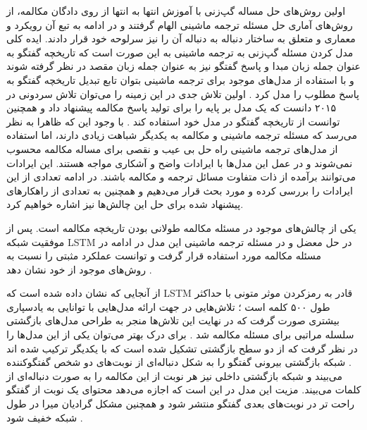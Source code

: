 اولین روش‌های حل مساله گپ‌زنی با آموزش انتها به انتها 	از روی دادگان مکالمه، از روش‌های آماری حل مسئله ترجمه ماشینی الهام گرفتند و در ادامه به تبع آن رویکرد و معماری 
و
متعلق به ساختار دنباله به دنباله آن را نیز سرلوحه خود قرار دادند. ایده کلی مدل‌ کردن مسئله گپ‌زنی به ترجمه ماشینی به این صورت است که تاریخچه گفتگو به عنوان جمله زبان مبدا و پاسخ گفتگو نیز به عنوان جمله زبان مقصد در نظر گرفته شوند و با استفاده از مدل‌های موجود برای ترجمه ماشینی بتوان تابع تبدیل تاریخچه گفتگو به پاسخ مطلوب را مدل کرد
\cite{ritter-etal-2011-data}
.
اولین تلاش جدی در این زمینه را می‌‌توان تلاش سردونی در ۲۰۱۵ دانست که یک مدل بر پایه 
را برای تولید پاسخ مکالمه پیشنهاد داد و همچنین توانست از تاریخچه گفتگو در مدل خود استفاده کند
\cite{DBLP:journals/corr/SordoniGABJMNGD15}
.
با وجود این که ظاهرا به نظر می‌رسد که مسئله ترجمه ماشینی و مکالمه به یکدیگر شباهت زیادی دارند، اما استفاده از مدل‌های ترجمه ماشینی راه حل بی عیب و نقصی برای مساله مکالمه محسوب نمی‌شوند و در عمل این مدل‌ها با ایرادات واضح و آشکاری مواجه هستند. این ایرادات می‌توانند برآمده از ذات متفاوت مسائل ترجمه و مکالمه باشند. در ادامه تعدادی از این ایرادات را بررسی کرده و مورد بحث قرار می‌دهیم و همچنین به تعدادی از راهکارهای پیشنهاد شده برای حل این چالش‌ها نیز اشاره خواهیم کرد.

یکی از چالش‌های موجود در مسئله مکالمه طولانی بودن تاریخچه مکالمه است. پس از موفقیت شبکه LSTM در حل معضل 
و 
در مسئله ترجمه ماشینی این مدل در ادامه در مسئله مکالمه مورد استفاده قرار گرفت و توانست عملکرد مثبتی را نسبت به روش‌های موجود از خود نشان دهد
\cite{A_Neural_Conversational_Model}.

از آنجایی که نشان داده شده است که LSTM قادر به رمزکردن موثر متونی با حداکثر طول ۵۰۰ کلمه است
\cite{DBLP:journals/corr/abs-1805-04623}
؛
تلاش‌هایی در جهت ارائه مدل‌هایی با توانایی به یادسپاری بیشتری صورت گرفت که در نهایت این تلاش‌ها منجر به طراحی مدل‌های بازگشتی سلسله مراتبی برای مسئله مکالمه شد
\cite{DBLP:journals/corr/SerbanSBCP15, DBLP:journals/corr/XingWWZHM17, DBLP:journals/corr/SordoniBVLSN15}.
برای درک بهتر می‌توان یکی از این مدل‌ها را در نظر گرفت که از دو سطح بازگشتی تشکیل شده است که با یکدیگر ترکیب شده اند
\cite{DBLP:journals/corr/SordoniBVLSN15}.
شبکه بازگشتی بیرونی گفتگو را به شکل دنباله‌ای از نوبت‌های دو شخص گفتگوکننده می‌بیند و شبکه بازگشتی داخلی نیز هر نوبت از این مکالمه را به صورت دنباله‌ای از کلمات می‌بیند. مزیت این مدل در این است که اجازه می‌دهد محتوای یک نوبت از گفتگو راحت تر در نوبت‌های بعدی گفتگو منتشر شود و همچنین مشکل گرادیان میرا در طول شبکه خفیف شود
\cite{Gao_Neural_Approaches}.

